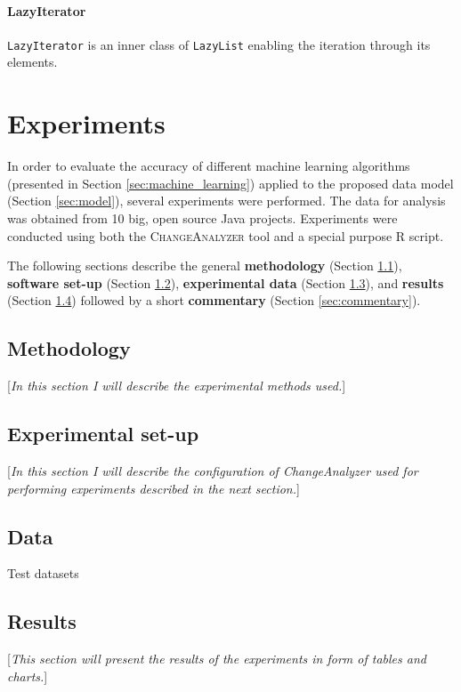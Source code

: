 \documentclass{pracamgr}
\newcommand{\ca}{\textsc{ChangeAnalyzer}\xspace}
\begin{document}
\subsubsection*{LazyIterator}
\texttt{LazyIterator} is an inner class of \texttt{LazyList} enabling the iteration through its elements.

\chapter{Experiments}
\label{cha:experiments}
In order to evaluate the accuracy of different machine learning algorithms (presented in Section \ref{sec:machine_learning}) applied to the proposed data model (Section \ref{sec:model}), several experiments were performed. The data for analysis was obtained from 10 big, open source Java projects. Experiments were conducted using both the \ca tool and a special purpose R script.

The following sections describe the general \textbf{methodology} (Section \ref{sec:methodology}), \textbf{software set-up} (Section \ref{sec:set-up}), \textbf{experimental data} (Section \ref{sec:data}), and \textbf{results} (Section \ref{sec:results}) followed by a short \textbf{commentary} (Section \ref{sec:commentary}).

\section{Methodology}
\label{sec:methodology}
[\textit{In this section I will describe the experimental methods used.}]

\section{Experimental set-up}
\label{sec:set-up}
[\textit{In this section I will describe the configuration of ChangeAnalyzer used for performing experiments described in the next section.}]

\section{Data}
\label{sec:data}

\begin{table}[h]
\centering
\caption{Test datasets}
\label{tab:test_datasets}

\end{table}

\section{Results}
\label{sec:results}
[\textit{This section will present the results of the experiments in form of tables and charts.}]
\end{document}
